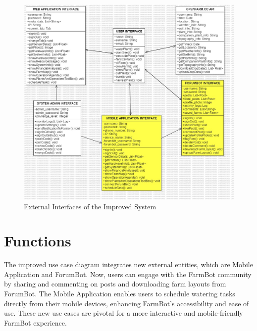 \begin{figure}[htbp]
    \centering
    \includegraphics[width=1\linewidth]{Figures/external_interfaces_improved.jpg}
    \caption{External Interfaces of the Improved System}
    \label{ExternalInterfacesImproved}
\end{figure}

\newpage

\section{Functions}
The improved use case diagram integrates new external entities, which are Mobile Application and ForumBot. Now, users can engage with the FarmBot community by sharing and commenting on posts and downloading farm layouts from ForumBot. The Mobile Application enables users to schedule watering tasks directly from their mobile devices, enhancing FarmBot's accessibility and ease of use. These new use cases are pivotal for a more interactive and mobile-friendly FarmBot experience.

